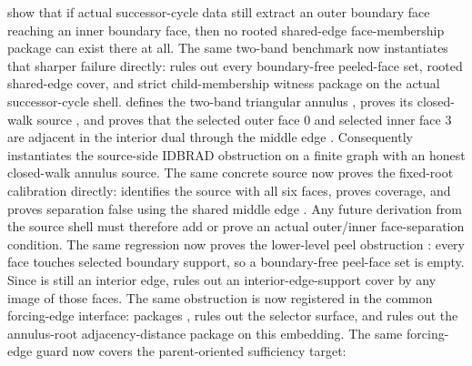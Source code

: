 \documentclass[11pt]{article}
\begin{document}
\begin{itemize}
show that if actual successor-cycle data still extract an outer boundary face
reaching an inner boundary face, then no rooted shared-edge face-membership
package can exist there at all.
The same two-band benchmark now instantiates that sharper failure directly:
rules out every boundary-free peeled-face set, rooted shared-edge cover, and
strict child-membership witness package on the actual successor-cycle shell.
defines the two-band triangular annulus
, proves its closed-walk source
, and proves that the selected
outer face \(0\) and selected inner face \(3\) are adjacent in the interior
dual through the middle edge .  Consequently
instantiates the source-side IDBRAD obstruction on a finite graph with an
honest closed-walk annulus source.  The same concrete source now proves the
fixed-root calibration directly:
 identifies the source
 with all six faces,
 proves coverage, and
 proves separation
false using the shared middle edge .  Any future derivation from
the source shell must therefore add or prove an actual outer/inner
face-separation condition.  The same regression now proves the lower-level
peel obstruction
: every face touches
selected boundary support, so a boundary-free peel-face set is empty.  Since
 is still an interior edge,
rules out an interior-edge-support cover by any image of those faces.  The
same obstruction is now registered in the common forcing-edge interface:
 packages ,
 rules out
the selector surface, and
rules out the annulus-root adjacency-distance package on this embedding.
The same forcing-edge guard now covers the parent-oriented sufficiency target:

\end{itemize}
\end{document}
